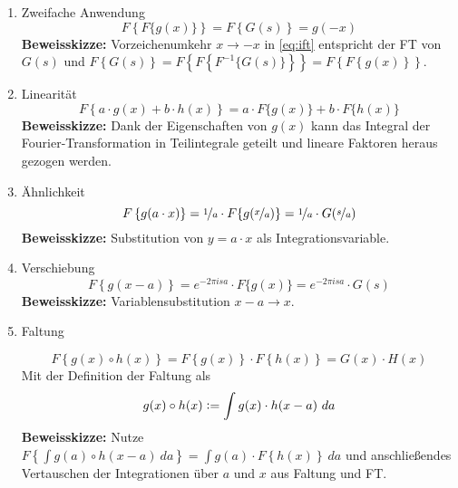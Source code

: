 \begin{enumerate}
	\item{Zweifache Anwendung}
	\begin{equation}
	F\left\{ F\{g(x)\} \right\} = F\left\{ G(s) \right\} = g(-x)
	\label{eq:umdreh}
	\end{equation}\textbf{Beweisskizze:} Vorzeichenumkehr $x \rightarrow -x$ in \ref{eq:ift} entspricht der FT von $G(s)$ und $F\left\{ G(s) \right\} = F\left\{ F\left\{F^{-1}\{G(s)\}\right\} \right\} = F\left\{ F\left\{g(x)\right\} \right\}$.
	
	\item{Linearität}
	\begin{equation}
		F\left\{ a\cdot g(x)+b\cdot h(x) \right\} = a\cdot F\{g(x)\}+b\cdot F\{h(x)\}
		\label{eq:lin}
	\end{equation}
	\textbf{Beweisskizze:} Dank der Eigenschaften von $g(x)$ kann das Integral der Fourier-Transformation in Teilintegrale geteilt und lineare Faktoren heraus gezogen werden.
	
	\item{Ähnlichkeit}
	\begin{equation}
		F\left\{ g(a\cdot x) \right\} = \nicefrac{1}{a}\cdot F\{g(\nicefrac{x}{a})\} = \nicefrac{1}{a}\cdot G(\nicefrac{s}{a})
		\label{eq:sim}
	\end{equation}\textbf{Beweisskizze:} Substitution von $y=a\cdot x$ als Integrationsvariable.
	
	\item{Verschiebung}
	\begin{equation}
		F\left\{ g(x-a) \right\} = e^{-2\pi isa} \cdot F\{g(x)\} = e^{-2\pi isa} \cdot G(s)
		\label{eq:vers}
	\end{equation}
	\textbf{Beweisskizze:} Variablensubstitution $x-a \rightarrow x$.
	
	\item{Faltung}
	
	\begin{equation}
	F\left\{ g(x) \circ h(x) \right\} = F\left\{ g(x) \right\} \cdot F\left\{  h(x) \right\} =G(x)\cdot H(x)
	\label{eq:ffalt}
	\end{equation}
	Mit der Definition der Faltung als
	\begin{equation}
		g(x)\circ h(x) \vcentcolon= \int g(x) \cdot h(x-a) ~da
		\label{eq:faltung}
	\end{equation}
	\textbf{Beweisskizze:} Nutze $F\left\{ \int g(a) \circ h(x-a) ~da \right\}=\int g(a) \cdot F\left\{ h(x) \right\} ~da$ und anschließendes Vertauschen der Integrationen über $a$ und $x$ aus Faltung und FT.
	
	
	
\end{enumerate}